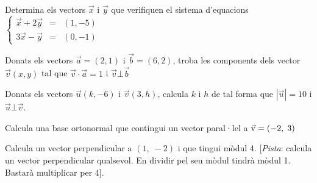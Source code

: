 \pagebreak
\begin{activitats}
	
	\begin{mylist}	
		
		\exer Determina els vectors $\vec x$ i $\vec y$ que verifiquen el sistema d'equacions $\left\{ \begin{array}{lcl} \vec x + 2 \vec y &=& (1, -5) \\ 3\vec x - \vec y &=& (0, -1) \end{array} \right.$
		
		
		\exer Donats els vectors $\vec a=(2, 1)$ i $\vec b=(6, 2)$, troba les components dels vector $\vec v(x, y)$ tal que $\vec v \cdot \vec a =1$  i $\vec v \bot \vec b$
		
		
		\exer Donats els vectors $\vec u(k, -6)$ i $\vec v(3,h)$, calcula $k$ i $h$ de tal forma que $|\vec u|=10$ i $\vec u \bot \vec v$.
		
		
		\exer  Calcula una base ortonormal que contingui un vector paral·lel a $\vec{\mathrm{v}}=\left(-2,\; 3\right)$
		
		
		\exer  Calcula un vector perpendicular a $ \left(1,\; -2\right) $ i que tingui mòdul 4.
		[\textit{Pista}: calcula un vector perpendicular qualsevol. En dividir pel seu mòdul tindrà mòdul 1. Bastarà multiplicar per 4].
		
		

\end{mylist}
\end{activitats}
